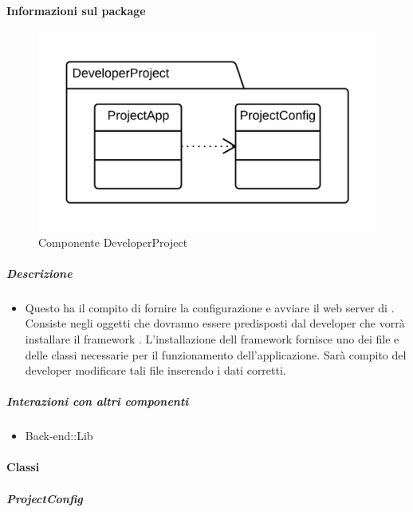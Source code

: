 	\paragraph{Informazioni sul package} 
		\begin{figure}[H] 
			\begin{center} 
				\includegraphics[scale=0.17]{uml/package/Back-end::DeveloperProject.png}  
				\caption{Componente DeveloperProject}
			\end{center}  
		\end{figure} 
	\subparagraph{Descrizione} 
		\begin{itemize}
		\item[] Questo  ha il compito di fornire la configurazione e avviare il web server di . Consiste negli oggetti che dovranno essere predisposti dal developer che vorrà installare il framework . L'installazione dell framework  fornisce uno  dei file e delle classi necessarie per il funzionamento dell'applicazione. Sarà compito del developer modificare tali file inserendo i dati corretti.
		\end{itemize} 
	\subparagraph{Interazioni con altri componenti} 
		\begin{itemize} 
				\item Back-end::Lib  
		\end{itemize} 
		\paragraph{Classi}
			\subparagraph{ProjectConfig}
				
